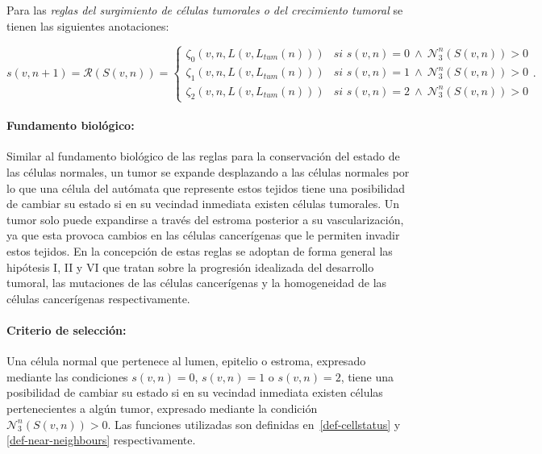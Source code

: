 Para las \emph{reglas del surgimiento de c\'elulas tumorales o del crecimiento tumoral} se tienen las siguientes anotaciones:\label{NOT-crecimiento-tumoral}

\begin{equation*}
s(v,n+1)=\mathcal{R}(S(v,n))=\left\lbrace
	\begin{array}{ll}		
		\zeta_0(v,n,L(v,L_{tum}(n))) & \textit{si } s(v,n)=0~\wedge~\mathcal{N}_3^n(S(v,n)) > 0 \\	
		\zeta_1(v,n,L(v,L_{tum}(n))) & \textit{si } s(v,n)=1~\wedge~\mathcal{N}_3^n(S(v,n)) > 0 \\
		\zeta_2(v,n,L(v,L_{tum}(n))) & \textit{si } s(v,n)=2~\wedge~\mathcal{N}_3^n(S(v,n)) > 0 
	\end{array}
\right..
\end{equation*}

\paragraph*{{Fundamento biol\'ogico}:} Similar al fundamento biol\'ogico de las reglas para la conservaci\'on del estado de las c\'elulas normales, un tumor se expande desplazando a las c\'elulas normales por lo que una c\'elula del aut\'omata que represente estos tejidos tiene una posibilidad de cambiar su estado si en su vecindad inmediata existen c\'elulas tumorales. Un tumor solo puede expandirse a trav\'es del estroma posterior a su vascularizaci\'on, ya que esta provoca cambios en las c\'elulas cancer\'igenas que le permiten invadir estos tejidos. En la concepci\'on de estas reglas se adoptan de forma general las hip\'otesis I, II y VI que tratan sobre la progresi\'on idealizada del desarrollo tumoral, las mutaciones de las c\'elulas cancer\'igenas y la homogeneidad de las c\'elulas cancer\'igenas respectivamente.

\paragraph*{{Criterio de selecci\'on}:} Una c\'elula normal que pertenece al lumen, epitelio o estroma, expresado mediante las condiciones $s(v,n)=0$, $s(v,n)=1$ o $s(v,n)=2$, tiene una posibilidad de cambiar su estado si en su vecindad inmediata existen c\'elulas pertenecientes a alg\'un tumor, expresado mediante la condici\'on $\mathcal{N}_3^n(S(v,n))>0$. Las funciones utilizadas son definidas en~\ref{def-cellstatus} y \ref{def-near-neighbours} respectivamente.

